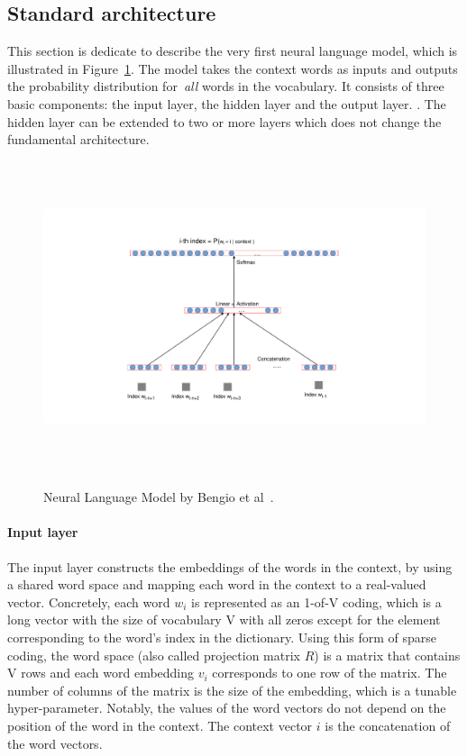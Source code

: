\subsection{Standard architecture}

This section is dedicate to describe the very first neural language model, which is illustrated in Figure~\ref{fig:neuralBengio}. The model takes the context words as inputs and outputs the probability distribution for~\textit{all} words in the vocabulary. It consists of three basic components: the input layer, the hidden layer and the output layer. . The hidden layer can be extended to two or more layers which does not change the fundamental architecture. 

~ \begin{figure}[!t]
~ \centering
~ \includegraphics[width=\columnwidth]{figures/neuralLM.pdf}
~ \caption{Neural Language Model by Bengio et al~\cite{bengio2003neural}.}  
~ \label{fig:neuralBengio}
~ \end{figure}

\paragraph{Input layer}
The input layer constructs the embeddings of the words in the context, by using a shared word space and mapping each word in the context to a real-valued vector. Concretely, each word $w_i$ is represented as an 1-of-V coding, which is a long vector with the size of vocabulary V with all zeros except for the element corresponding to the word's index in the dictionary. Using this form of sparse coding, the word space (also called projection matrix $R$) is a matrix that contains V rows and each word embedding $v_i$ corresponds to one row of the matrix. The number of columns of the matrix is the size of the embedding, which is a tunable hyper-parameter. Notably, the values of the word vectors do not depend on the position of the word in the context. The context vector $i$ is the concatenation of the word vectors.


